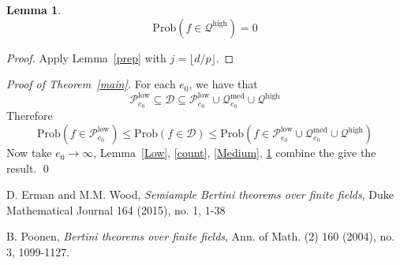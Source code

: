 \documentclass[12pt]{article}
\theoremstyle{plain}
\newtheorem{lemma}[equation]{Lemma}
\theoremstyle{definition}
\newcommand{\sD}{\mathcal{D}}
\newcommand{\sP}{\mathcal{P}}
\newcommand{\sQ}{\mathcal{Q}}
\newcommand{\<}{\langle}
\renewcommand{\>}{\rangle}
\newcommand{\Prob}{\mathrm{Prob}}
\begin{document}
\begin{lemma}
\label{High}
$$\Prob( f \in  \sQ^{\mathrm{high}}) = 0 $$
\end{lemma}
\begin{proof}
Apply Lemma~\ref{prep} with $j = \lfloor d/p \rfloor$. 
\end{proof}
\noindent \textit{Proof of Theorem~\ref{main}.} 
For each $e_0$, we have that 
$$  \sP_{e_0}^{\mathrm{low}} \subseteq \sD \subseteq \sP_{e_0}^{\mathrm{low}} \cup \sQ_{e_0}^{\mathrm{med}} \cup \sQ^{\mathrm{high}}$$
Therefore 
$$ \Prob(f \in \sP_{e_0}^{\mathrm{low}}) \le \Prob(f \in \sD) \le \Prob(f \in \sP_{e_0}^{\mathrm{low}} \cup \sQ_{e_0}^{\mathrm{med}} \cup \sQ^{\mathrm{high}})$$
Now take $e_0 \to \infty$, Lemma~\ref{Low}, \ref{count}, \ref{Medium}, \ref{High} combine the give the result. \qed
\begin{thebibliography}{9}
D. Erman and M.M. Wood, \textit{Semiample Bertini theorems over finite fields}, Duke Mathematical Journal 164 (2015), no. 1, 1-38

B. Poonen, \textit{Bertini theorems over finite fields}, Ann. of Math. (2) 160 (2004), no. 3, 1099-1127.
\end{thebibliography}
\end{document}
